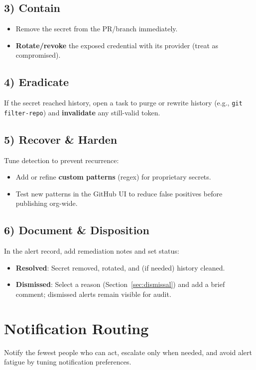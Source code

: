 \documentclass[11pt,a4paper]{article}
\begin{document}
\subsection*{3) Contain}
\begin{itemize}[leftmargin=1.2em]
  \item Remove the secret from the PR/branch immediately.
  \item \textbf{Rotate/revoke} the exposed credential with its provider (treat as compromised).
\end{itemize}

\subsection*{4) Eradicate}
If the secret reached history, open a task to purge or rewrite history (e.g., \texttt{git filter-repo}) and \textbf{invalidate} any still-valid token.

\subsection*{5) Recover \& Harden}
Tune detection to prevent recurrence:
\begin{itemize}[leftmargin=1.2em]
  \item Add or refine \textbf{custom patterns} (regex) for proprietary secrets.
  \item Test new patterns in the GitHub UI to reduce false positives before publishing org-wide.
\end{itemize}

\subsection*{6) Document \& Disposition}
In the alert record, add remediation notes and set status:
\begin{itemize}[leftmargin=1.2em]
  \item \textbf{Resolved}: Secret removed, rotated, and (if needed) history cleaned.
  \item \textbf{Dismissed}: Select a reason (Section~\ref{sec:dismissal}) and add a brief comment; dismissed alerts remain visible for audit.
\end{itemize}

\section{Notification Routing}
\begin{ghascallout}[Principles]
Notify the fewest people who can act, escalate only when needed, and avoid alert fatigue by tuning notification preferences.
\end{ghascallout}
\end{document}
